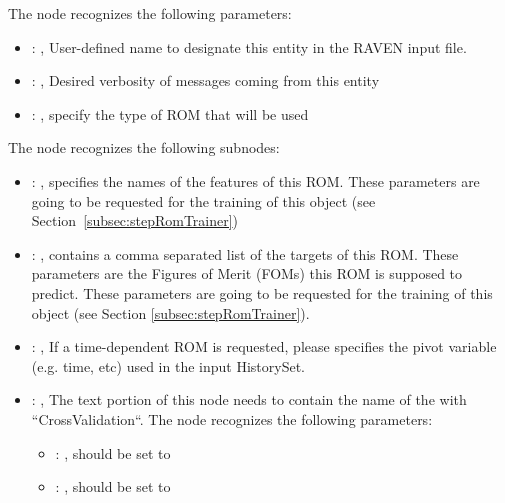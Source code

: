   The  node recognizes the following parameters:
    \begin{itemize}
      \item {}: , 
        User-defined name to designate this entity in the RAVEN input file.
      \item {}: , 
        Desired verbosity of messages coming from this entity
      \item {}: , 
        specify the type of ROM that will be used
  \end{itemize}

  The  node recognizes the following subnodes:
  \begin{itemize}
    \item {}: , 
      specifies the names of the features of this ROM.         \nb These parameters are going to be
      requested for the training of this object         (see Section~\ref{subsec:stepRomTrainer})

    \item {}: , 
      contains a comma separated list of the targets of this ROM. These parameters         are the
      Figures of Merit (FOMs) this ROM is supposed to predict.         \nb These parameters are
      going to be requested for the training of this         object (see Section
      \ref{subsec:stepRomTrainer}).

    \item {}: , 
      If a time-dependent ROM is requested, please specifies the pivot         variable (e.g. time,
      etc) used in the input HistorySet.

    \item {}: , 
      The text portion of this node needs to contain the name of the  with
               ``CrossValidation``.
      The  node recognizes the following parameters:
        \begin{itemize}
          \item {}: , 
            should be set to 
          \item {}: , 
            should be set to 
      \end{itemize}


\end{itemize}
